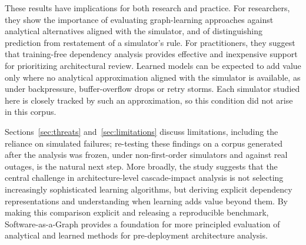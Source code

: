 \documentclass[preprint,3p]{elsarticle}
\begin{document}
These results have implications for both research and practice. For researchers, they show the importance of evaluating graph-learning approaches against analytical alternatives aligned with the simulator, and of distinguishing prediction from restatement of a simulator's rule. For practitioners, they suggest that training-free dependency analysis provides effective and inexpensive support for prioritizing architectural review. Learned models can be expected to add value only where no analytical approximation aligned with the simulator is available, as under backpressure, buffer-overflow drops or retry storms. Each simulator studied here is closely tracked by such an approximation, so this condition did not arise in this corpus.

Sections~\ref{sec:threats} and~\ref{sec:limitations} discuss limitations, including the reliance on simulated failures; re-testing these findings on a corpus generated after the analysis was frozen, under non-first-order simulators and against real outages, is the natural next step. More broadly, the study suggests that the central challenge in architecture-level cascade-impact analysis is not selecting increasingly sophisticated learning algorithms, but deriving explicit dependency representations and understanding when learning adds value beyond them. By making this comparison explicit and releasing a reproducible benchmark, Software-as-a-Graph provides a foundation for more principled evaluation of analytical and learned methods for pre-deployment architecture analysis.
\end{document}
